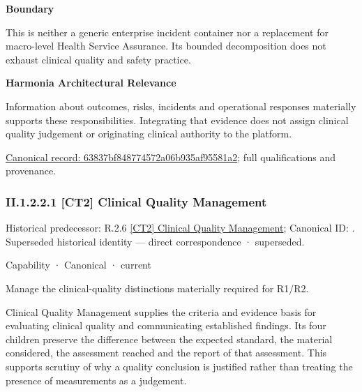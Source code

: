 \textbf{Boundary}



This is neither a generic enterprise incident container nor a replacement for macro-level Health Service Assurance. Its bounded decomposition does not exhaust clinical quality and safety practice.



\textbf{Harmonia Architectural Relevance}



Information about outcomes, risks, incidents and operational responses materially supports these responsibilities. Integrating that evidence does not assign clinical quality judgement or originating clinical authority to the platform.


{\footnotesize \href{../../../../../../../continuum/strategy/capability/63837bf848774572a06b935af95581a2.md}{Canonical record: 63837bf848774572a06b935af95581a2}; full qualifications and provenance.}\par
\subsubsection*{II.1.2.2.1 [CT2] Clinical Quality Management}
\label{navigation:II.1.2.2.1}

{\small Historical predecessor: R.2.6 \hyperref[element:dc1bece79eb7452e951d03a2ee6dfaa6]{[CT2] Clinical Quality Management}; Canonical ID: \texttt{}. Superseded historical identity — direct correspondence · superseded.}\par
\label{element:89761f2d38f846c39df1df0975964288}
{\small Capability · Canonical · current}\par

Manage the clinical-quality distinctions materially required for R1/R2.



Clinical Quality Management supplies the criteria and evidence basis for evaluating clinical quality and communicating established findings. Its four children preserve the difference between the expected standard, the material considered, the assessment reached and the report of that assessment. This supports scrutiny of why a quality conclusion is justified rather than treating the presence of measurements as a judgement.



